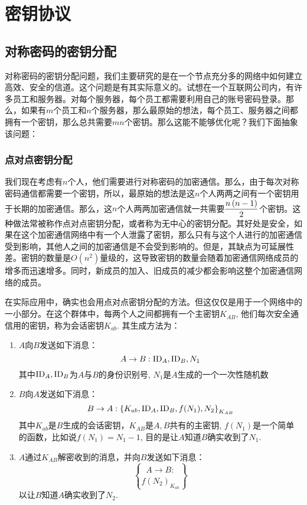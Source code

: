 \section{密钥协议}
\subsection{对称密码的密钥分配}
对称密码的密钥分配问题，我们主要研究的是在一个节点充分多的网络中如何建立高效、安全的信道。这个问题是有其实际意义的。试想在一个互联网公司内，有许多员工和服务器。对每个服务器，每个员工都需要利用自己的账号密码登录。那么，如果有$m$个员工和$n$个服务器，那么最原始的想法，每个员工、服务器之间都拥有一个密钥，那么总共需要$mn$个密钥。那么这能不能够优化呢？我们下面抽象该问题：
\subsubsection{点对点密钥分配}
我们现在考虑有$n$个人，他们需要进行对称密码的加密通信。那么，由于每次对称密码通信都需要一个密钥，所以，最原始的想法是这$n$个人两两之间有一个密钥用于长期的加密通信。那么，这$n$个人两两加密通信就一共需要$\displaystyle\frac{n\left( {n-1}\right)}{2}$个密钥。这种做法常被称作点对点密钥分配，或者称为无中心的密钥分配。其好处是安全，如果在这个加密通信网络中有一个人泄露了密钥，那么只有与这个人进行的加密通信受到影响，其他人之间的加密通信是不会受到影响的。但是，其缺点为可延展性差。密钥的数量是$O(n^2)$量级的，这导致密钥的数量会随着加密通信网络成员的增多而迅速增多。同时，新成员的加入、旧成员的减少都会影响这整个加密通信网络的成员。\par
在实际应用中，确实也会用点对点密钥分配的方法。但这仅仅是用于一个网络中的一小部分。在这个群体中，每两个人之间都拥有一个主密钥$K_{AB}$, 他们每次安全通信用的密钥，称为会话密钥$K_{ab}$. 其生成方法为：
\begin{enumerate}
	\item $A$向$B$发送如下消息：
	\[A\to B: \mathrm{ID}_A, \mathrm{ID}_B, N_1\]
	其中$\mathrm{ID}_A, \mathrm{ID}_B$为$A$与$B$的身份识别号, $N_1$是$A$生成的一个一次性随机数
	\item $B$向$A$发送如下消息：
	\[B\to A: \left\{ {K_{ab}, \mathrm{ID}_A, \mathrm{ID}_B, f(N_1), N_2} \right\}_{K_{AB}}\]
	其中$K_{ab}$是$B$生成的会话密钥，$K_{AB}$是$A, B$共有的主密钥, $f(N_1)$是一个简单的函数，比如说$f(N_1)=N_1-1$, 目的是让$A$知道$B$确实收到了$N_1$.
	\item $A$通过$K_{AB}$解密收到的消息，并向$B$发送如下消息：
	\[A\to B:\brace{f(N_2)}_{K_{ab}}\]
	以让$B$知道$A$确实收到了$N_2$.
\end{enumerate}
